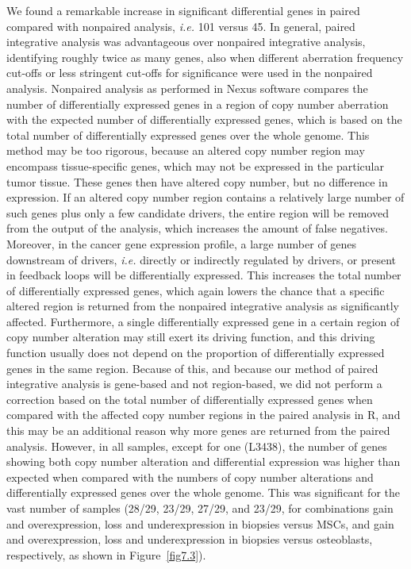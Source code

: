 We found a remarkable increase in significant
differential genes in paired compared with nonpaired
analysis, {\it i.e.} 101 versus 45. In general,
paired integrative analysis was advantageous over
nonpaired integrative analysis, identifying roughly
twice as many genes, also when different aberration
frequency cut-offs or less stringent cut-offs
for significance were used in the nonpaired analysis.
Nonpaired analysis as performed in Nexus
software compares the number of differentially
expressed genes in a region of copy number aberration
with the expected number of differentially
expressed genes, which is based on the total
number of differentially expressed genes over the
whole genome. This method may be too rigorous,
because an altered copy number region may
encompass tissue\hyp{}specific genes, which may not
be expressed in the particular tumor tissue.
These genes then have altered copy number, but
no difference in expression. If an altered copy
number region contains a relatively large number
of such genes plus only a few candidate drivers,
the entire region will be removed from the output
of the analysis, which increases the amount
of false negatives. Moreover, in the cancer gene
expression profile, a large number of genes downstream
of drivers, {\it i.e.} directly or indirectly regulated
by drivers, or present in feedback loops will
be differentially expressed. This increases the
total number of differentially expressed genes,
which again lowers the chance that a specific
altered region is returned from the nonpaired
integrative analysis as significantly affected. Furthermore,
a single differentially expressed gene
in a certain region of copy number alteration may
still exert its driving function, and this driving
function usually does not depend on the proportion
of differentially expressed genes in the same
region. Because of this, and because our method
of paired integrative analysis is gene\hyp{}based and
not region\hyp{}based, we did not perform a correction
based on the total number of differentially
expressed genes when compared with the
affected copy number regions in the paired analysis
in R, and this may be an additional reason
why more genes are returned from the paired
analysis. However, in all samples, except for one
(L3438), the number of genes showing both copy
number alteration and differential expression was
higher than expected when compared with the
numbers of copy number alterations and differentially
expressed genes over the whole genome.
This was significant for the vast number of samples
(28/29, 23/29, 27/29, and 23/29, for combinations
gain and overexpression, loss and
underexpression in biopsies versus MSCs, and
gain and overexpression, loss and underexpression
in biopsies versus osteoblasts, respectively,
as shown in Figure~\ref{fig7.3}).

